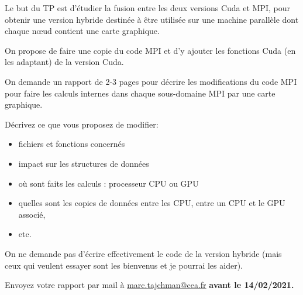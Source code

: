 \documentclass{beamer}
\begin{document}
\begin{frame}
\medskip
 
Le but du TP est d'étudier la fusion entre les deux versions Cuda et MPI, pour obtenir une version hybride destinée à être utilisée sur une machine parallèle dont chaque n\oe ud contient une carte graphique.
  
 \vfill
On propose de faire une copie du code MPI et d'y ajouter les fonctions Cuda (en les adaptant) de la version Cuda.

\vfill
On demande un rapport de 2-3 pages pour décrire les modifications du code MPI pour faire les calculs internes dans chaque sous-domaine MPI par une carte graphique.

   \vfill

\end{frame}

\begin{frame}

Décrivez ce que vous proposez de modifier:
\begin{itemize}
	\item fichiers et fonctions concernés
	\item impact sur les structures de données
	\item où sont faits les calculs : processeur CPU ou GPU
	\item quelles sont les copies de données entre les CPU, entre un CPU et le GPU associé,
	\item etc.
\end{itemize}

\vfill

On ne demande pas d'écrire effectivement le code de la version hybride (mais ceux qui veulent essayer sont les bienvenus et je pourrai les aider).
   
   \vfill
Envoyez votre rapport par mail à \href{mailto:marc.tajchman@cea.fr}{marc.tajchman@cea.fr}
{\bf avant le 14/02/2021.}

\end{frame}
\end{document}
